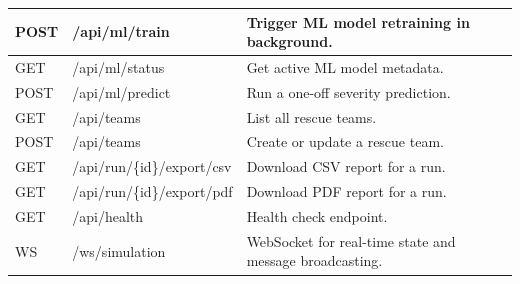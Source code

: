 \begin{longtable}{|l|l|p{6cm}|}
\hline
POST & /api/ml/train & Trigger ML model retraining in background. \\
\hline
GET & /api/ml/status & Get active ML model metadata. \\
\hline
POST & /api/ml/predict & Run a one-off severity prediction. \\
\hline
GET & /api/teams & List all rescue teams. \\
\hline
POST & /api/teams & Create or update a rescue team. \\
\hline
GET & /api/run/\{id\}/export/csv & Download CSV report for a run. \\
\hline
GET & /api/run/\{id\}/export/pdf & Download PDF report for a run. \\
\hline
GET & /api/health & Health check endpoint. \\
\hline
WS & /ws/simulation & WebSocket for real-time state and message broadcasting. \\
\hline
\end{longtable}
